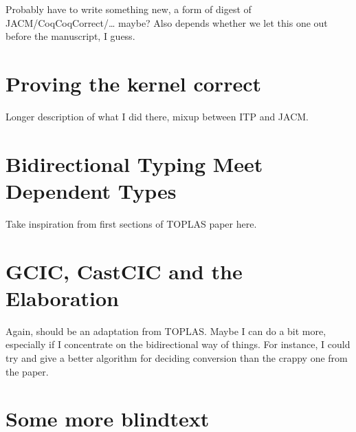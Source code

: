 \documentclass[
  french,english,
	fontsize=10pt, %
	twoside=true, %
	secnumdepth=1, %
]{kaobook/kaobook}
\begin{document}
Probably have to write something new, a form of digest of JACM/CoqCoqCorrect/… maybe? Also
depends whether we let this one out before the manuscript, I guess.

\chapter{Proving the kernel correct}

Longer description of what I did there, mixup between ITP and JACM.


\chapter{Bidirectional Typing Meet Dependent Types}

Take inspiration from first sections of TOPLAS paper here.

\chapter{GCIC, CastCIC and the Elaboration}

Again, should be an adaptation from TOPLAS. Maybe I can do a bit more, especially if
I concentrate on the bidirectional way of things. For instance, I could try and give a
better algorithm for deciding conversion than the crappy one from the paper.

\appendix %


\chapter{Some more blindtext}

\blindtext


\backmatter %

\end{document}
